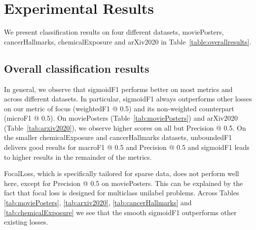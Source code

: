 
\section{Experimental Results}
\label{sec:orgc23a664}

We present classification results on four different datasets, movie\-Posters, cancerHallmarks, chemicalExposure and arXiv2020 in Table~\ref{table:overallresults}. 

\subsection{Overall classification results}

In general, we observe that sigmoidF1 performs better on most metrics and across different datasets. In particular, sigmoidF1 always outperforms other losses on our metric of focus (weightedF1 @ 0.5) and its non-weighted counterpart (microF1 @ 0.5). On moviePosters (Table~\ref{tab:moviePosters}) and arXiv2020 (Table~\ref{tab:arxiv2020}), we observe higher scores on all but Precision @ 0.5. On the smaller chemicalExposure and cancerHallmarks datasets, unboundedF1 delivers good results for macroF1 @ 0.5 and Precision @ 0.5 and sigmoidF1 leads to higher results in the remainder of the metrics.



FocalLoss, which is specifically tailored for sparse data, does not perform well here, except for Precision @ 0.5 on moviePosters. This can be explained by the fact that focal loss is designed for multiclass unilabel problems. Across Tables \ref{tab:moviePosters}, \ref{tab:arxiv2020}, \ref{tab:cancerHallmarks} and \ref{tab:chemicalExposure} we see that the smooth sigmoidF1 outperforms other existing losses.

